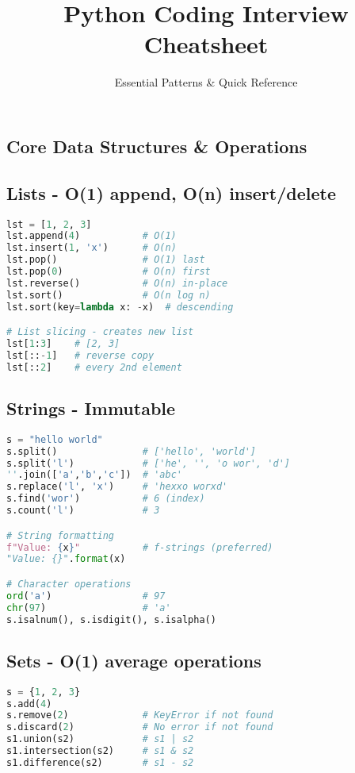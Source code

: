 \documentclass[9pt,a4paper]{article}
\title{\textbf{Python Coding Interview Cheatsheet}}
\author{Essential Patterns \& Quick Reference}
\date{}
\begin{document}
\maketitle

\begin{multicols}{2}

\section*{Core Data Structures \& Operations}
\subsection*{Lists - O(1) append, O(n) insert/delete}
\begin{lstlisting}[language=Python]
lst = [1, 2, 3]
lst.append(4)           # O(1)
lst.insert(1, 'x')      # O(n)
lst.pop()               # O(1) last
lst.pop(0)              # O(n) first
lst.reverse()           # O(n) in-place
lst.sort()              # O(n log n)
lst.sort(key=lambda x: -x)  # descending

# List slicing - creates new list
lst[1:3]    # [2, 3]
lst[::-1]   # reverse copy
lst[::2]    # every 2nd element
\end{lstlisting}

\subsection*{Strings - Immutable}
\begin{lstlisting}[language=Python]
s = "hello world"
s.split()               # ['hello', 'world']
s.split('l')            # ['he', '', 'o wor', 'd']
''.join(['a','b','c'])  # 'abc'
s.replace('l', 'x')     # 'hexxo worxd'
s.find('wor')           # 6 (index)
s.count('l')            # 3

# String formatting
f"Value: {x}"           # f-strings (preferred)
"Value: {}".format(x)

# Character operations
ord('a')                # 97
chr(97)                 # 'a'
s.isalnum(), s.isdigit(), s.isalpha()
\end{lstlisting}

\subsection*{Sets - O(1) average operations}
\begin{lstlisting}[language=Python]
s = {1, 2, 3}
s.add(4)
s.remove(2)             # KeyError if not found
s.discard(2)            # No error if not found
s1.union(s2)            # s1 | s2
s1.intersection(s2)     # s1 & s2
s1.difference(s2)       # s1 - s2
\end{lstlisting}


\end{multicols}
\end{document}
